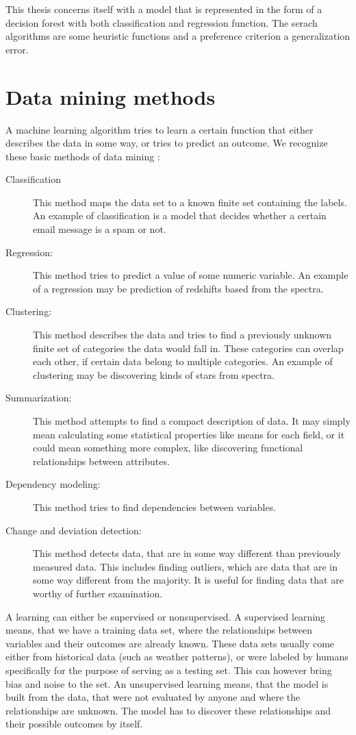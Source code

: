 \documentclass[thesis=B,english]{FITthesis}[2012/10/20]
\begin{document}
This thesis concerns itself with a model that is represented in the form of a decision forest with both classification and regression function. The serach algorithms are some heuristic functions and a preference criterion a generalization error.

\section{Data mining methods}
A machine learning algorithm tries to learn a certain function that either describes the data in some way, or tries to predict an outcome. We recognize these basic methods of data mining \cite{fayyad1996data}:
\begin{description}
\item [Classification] This method maps the data set to a known finite set containing the labels. An example of classification is a model that decides whether a certain email message is a spam or not.
\item [Regression:] This method tries to predict a value of some numeric variable. An example of a regression may be prediction of redshifts based from the spectra.
\item [Clustering:] This method describes the data and tries to find a previously unknown finite set of categories the data would fall in. These categories can overlap each other, if certain data belong to multiple categories. An example of clustering may be discovering kinds of stars from spectra.
\item [Summarization:] This method attempts to find a compact description of data. It may simply mean calculating some statistical properties like means for each field, or it could mean something more complex, like discovering functional relationships between attributes.
\item [Dependency modeling:] This method tries to find dependencies between variables. 
\item [Change and deviation detection:] This method detects data, that are in some way different than previously measured data. This includes finding outliers, which are data that are in some way different from the majority. It is useful for finding data that are worthy of further examination.
\end{description}

A learning can either be supervised or nonsupervised. A supervised learning means, that we have a training data set, where the relationships between variables and their outcomes are already known. These data sets usually come either from historical data (such as weather patterns), or were labeled by humans specifically for the purpose of serving as a testing set. This can however bring bias and noise to the set. An unsupervised learning means, that the model is built from the data, that were not evaluated by anyone and where the relationships are unknown. The model has to discover these relationships and their possible outcomes by itself.
\end{document}
